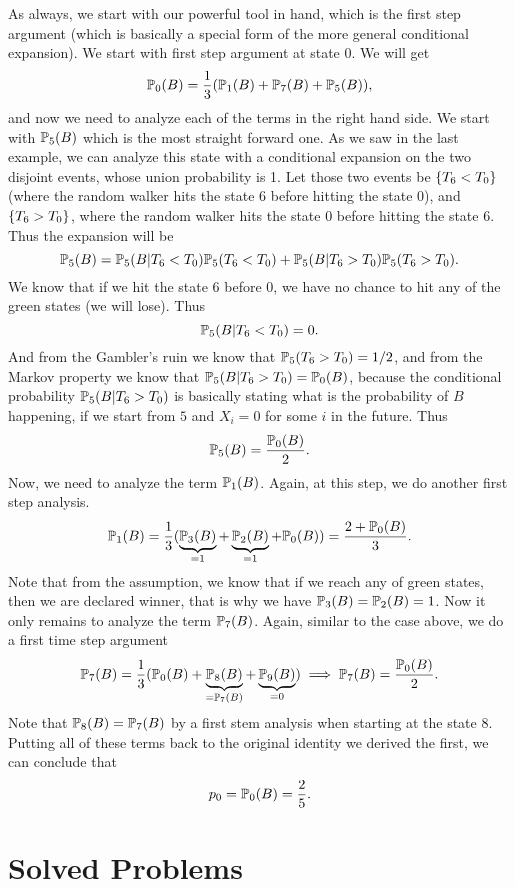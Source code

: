 \begin{solution}
	As always, we start with our powerful tool in hand, which is the first step argument (which is basically a special form of the more general conditional expansion). We start with first step argument at state $0$. We will get
	\[ \mathbb{P}_0(B) = \frac{1}{3} (\mathbb{P}_1(B) + \mathbb{P}_7(B) + \mathbb{P}_5(B) ), \]
	and now we need to analyze each of the terms in the right hand side. We start with $\mathbb{P}_5(B)$ which is the most straight forward one. As we saw in the last example, we can analyze this state with a conditional expansion on the two disjoint events, whose union probability is 1. Let those two events be $\{T_6 < T_0\}$ (where the random walker hits the state $6$ before hitting the state $0$), and $\{T_6 > T_0\}$, where the random walker hits the state $0$ before hitting the state $6$. Thus the expansion will be
	\[ \mathbb{P}_5(B) = \mathbb{P}_5(B|T_6 < T_0) \mathbb{P}_5(T_6 < T_0) + \mathbb{P}_5(B|T_6 > T_0)\mathbb{P}_5(T_6 > T_0). \]
	We know that if we hit the state $6$ before $0$, we have no chance to hit any of the green states (we will lose). Thus
	\[ \mathbb{P}_5(B|T_6<T_0) = 0. \]
	And from the Gambler's ruin we know that $\mathbb{P}_5(T_6>T_0) = 1/2$, and from the Markov property we know that $\mathbb{P}_5(B|T_6>T_0) = \mathbb{P}_0(B)$, because the conditional probability $\mathbb{P}_5(B|T_6>T_0)$ is basically stating what is the probability of $B$ happening, if we start from $5$ and $X_i = 0$ for some $i$ in the future. Thus 
	\[ \mathbb{P}_5(B) = \frac{\mathbb{P}_0(B)}{2}. \]
	Now, we need to analyze the term $\mathbb{P}_1(B)$. Again, at this step, we do another first step analysis.
	\[  \mathbb{P}_1(B) = \frac{1}{3} (\underbrace{\mathbb{P}_3(B)}_{=1} + \underbrace{\mathbb{P}_2(B)}_{=1} +\mathbb{P}_0(B)) = \frac{2+\mathbb{P}_0(B)}{3}. \]
	Note that from the assumption, we know that if we reach any of green states, then we are declared winner, that is why we have $\mathbb{P}_3(B) = \mathbb{P}_2(B) = 1$. Now it only remains to analyze the term $\mathbb{P}_7(B)$. Again, similar to the case above, we do a first time step argument
	\[ \mathbb{P}_7(B) = \frac{1}{3} ( \mathbb{P}_0(B) + \underbrace{\mathbb{P}_8(B)}_{=\mathbb{P}_7(B)} + \underbrace{\mathbb{P}_9(B)}_{=0} ) \implies \mathbb{P}_7(B) = \frac{\mathbb{P}_0(B)}{2}.\]
	Note that $\mathbb{P}_8(B) = \mathbb{P}_7(B)$ by a first stem analysis when starting at the state $8$. Putting all of these terms back to the original identity we derived the first, we can conclude that 
	\[ p_0 = \mathbb{P}_0(B) = \frac{2}{5}. \]
\end{solution}




\section{Solved Problems}






